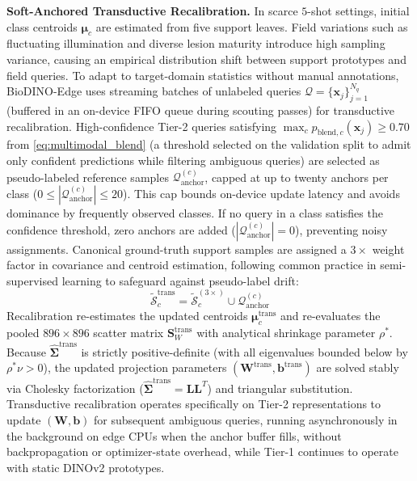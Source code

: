 \documentclass[conference]{IEEEtran}
\begin{document}
\textbf{Soft-Anchored Transductive Recalibration.} In scarce $5$-shot settings, initial class centroids $\boldsymbol{\mu}_c$ are estimated from five support leaves. Field variations such as fluctuating illumination and diverse lesion maturity introduce high sampling variance, causing an empirical distribution shift between support prototypes and field queries. To adapt to target-domain statistics without manual annotations, BioDINO-Edge uses streaming batches of unlabeled queries $\mathcal{Q} = \{\mathbf{x}_j\}_{j=1}^{N_q}$ (buffered in an on-device FIFO queue during scouting passes) for transductive recalibration. High-confidence Tier-2 queries satisfying $\max_c p_{\text{blend}, c}(\mathbf{x}_j) \ge 0.70$ from \eqref{eq:multimodal_blend} (a threshold selected on the validation split to admit only confident predictions while filtering ambiguous queries) are selected as pseudo-labeled reference samples $\mathcal{Q}_{\text{anchor}}^{(c)}$, capped at up to twenty anchors per class ($0 \le |\mathcal{Q}_{\text{anchor}}^{(c)}| \le 20$). This cap bounds on-device update latency and avoids dominance by frequently observed classes. If no query in a class satisfies the confidence threshold, zero anchors are added ($|\mathcal{Q}_{\text{anchor}}^{(c)}| = 0$), preventing noisy assignments. Canonical ground-truth support samples are assigned a $3\times$ weight factor in covariance and centroid estimation, following common practice in semi-supervised learning to safeguard against pseudo-label drift:
\begin{equation}
    \tilde{\mathcal{S}}_c^{\text{trans}} = \tilde{\mathcal{S}}_c^{(3\times)} \cup \mathcal{Q}_{\text{anchor}}^{(c)}
\end{equation}
Recalibration re-estimates the updated centroids $\boldsymbol{\mu}_c^{\text{trans}}$ and re-evaluates the pooled $896 \times 896$ scatter matrix $\mathbf{S}_W^{\text{trans}}$ with analytical shrinkage parameter $\rho^*$. Because $\hat{\mathbf{\Sigma}}^{\text{trans}}$ is strictly positive-definite (with all eigenvalues bounded below by $\rho^* \nu > 0$), the updated projection parameters $(\mathbf{W}^{\text{trans}}, \mathbf{b}^{\text{trans}})$ are solved stably via Cholesky factorization ($\hat{\mathbf{\Sigma}}^{\text{trans}} = \mathbf{L}\mathbf{L}^T$) and triangular substitution. Transductive recalibration operates specifically on Tier-2 representations to update $(\mathbf{W}, \mathbf{b})$ for subsequent ambiguous queries, running asynchronously in the background on edge CPUs when the anchor buffer fills, without backpropagation or optimizer-state overhead, while Tier-1 continues to operate with static DINOv2 prototypes.
\end{document}

